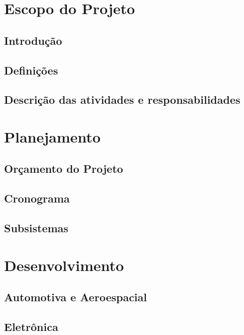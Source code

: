 \part{Escopo do Projeto}
\chapter{Introdução}


\chapter{Definições}


\chapter{Descrição das atividades e responsabilidades}


\openany

\part{Planejamento}
\chapter{Orçamento do Projeto}


\chapter{Cronograma}


\chapter{Subsistemas}


\part{Desenvolvimento}

\chapter{Automotiva e Aeroespacial}


\chapter{Eletrônica}


